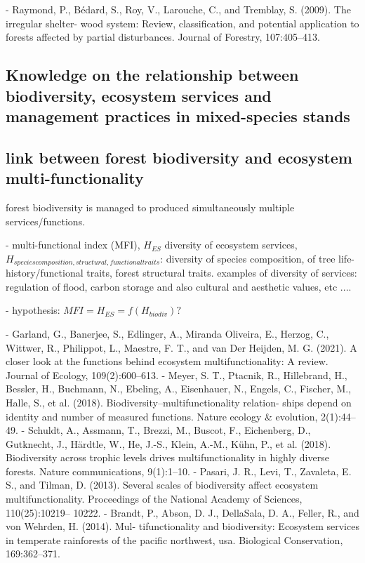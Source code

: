 \documentclass{article}
\begin{document}
- Raymond, P., Bédard, S., Roy, V., Larouche, C., and Tremblay, S. (2009). The irregular shelter-
wood system: Review, classification, and potential application to forests affected by partial
disturbances. Journal of Forestry, 107:405–413.

\subsection{Knowledge on the relationship between biodiversity, ecosystem services and management practices in mixed-species stands}


\subsection{link between forest biodiversity and ecosystem multi-functionality}

forest biodiversity is managed to produced simultaneously multiple services/functions. 

- multi-functional index (MFI), $H_{ES}$ diversity of ecosystem services, $H_{species composition, structural, functional traits}$: diversity of species composition, of tree life-history/functional traits, forest structural traits. examples of diversity of services: regulation of flood, carbon storage and also cultural and aesthetic values, etc ....

- hypothesis: $MFI = H_{ES} = f(H_{biodiv})? $

- Garland, G., Banerjee, S., Edlinger, A., Miranda Oliveira, E., Herzog, C., Wittwer, R., Philippot,
L., Maestre, F. T., and van Der Heijden, M. G. (2021). A closer look at the functions behind
ecosystem multifunctionality: A review. Journal of Ecology, 109(2):600–613.
- Meyer, S. T., Ptacnik, R., Hillebrand, H., Bessler, H., Buchmann, N., Ebeling, A., Eisenhauer,
N., Engels, C., Fischer, M., Halle, S., et al. (2018). Biodiversity–multifunctionality relation-
ships depend on identity and number of measured functions. Nature ecology & evolution,
2(1):44–49.
- Schuldt, A., Assmann, T., Brezzi, M., Buscot, F., Eichenberg, D., Gutknecht, J., Härdtle, W.,
He, J.-S., Klein, A.-M., Kühn, P., et al. (2018). Biodiversity across trophic levels drives
multifunctionality in highly diverse forests. Nature communications, 9(1):1–10.
- Pasari, J. R., Levi, T., Zavaleta, E. S., and Tilman, D. (2013). Several scales of biodiversity affect
ecosystem multifunctionality. Proceedings of the National Academy of Sciences, 110(25):10219–
10222.
- Brandt, P., Abson, D. J., DellaSala, D. A., Feller, R., and von Wehrden, H. (2014). Mul-
tifunctionality and biodiversity: Ecosystem services in temperate rainforests of the pacific
northwest, usa. Biological Conservation, 169:362–371.
\end{document}
